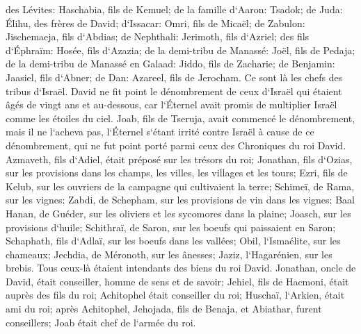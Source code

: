 \verse des Lévites: Haschabia, fils de Kemuel; de la famille d`Aaron: Tsadok; 
\verse de Juda: Élihu, des frères de David; d`Issacar: Omri, fils de Micaël; 
\verse de Zabulon: Jischemaeja, fils d`Abdias; de Nephthali: Jerimoth, fils d`Azriel; 
\verse des fils d`Éphraïm: Hosée, fils d`Azazia; de la demi-tribu de Manassé: Joël, fils de Pedaja; 
\verse de la demi-tribu de Manassé en Galaad: Jiddo, fils de Zacharie; de Benjamin: Jaasiel, fils d`Abner; 
\verse de Dan: Azareel, fils de Jerocham. Ce sont là les chefs des tribus d`Israël. 
\verse David ne fit point le dénombrement de ceux d`Israël qui étaient âgés de vingt ans et au-dessous, car l`Éternel avait promis de multiplier Israël comme les étoiles du ciel. 
\verse Joab, fils de Tseruja, avait commencé le dénombrement, mais il ne l`acheva pas, l`Éternel s`étant irrité contre Israël à cause de ce dénombrement, qui ne fut point porté parmi ceux des Chroniques du roi David. 
\verse Azmaveth, fils d`Adiel, était préposé sur les trésors du roi; Jonathan, fils d`Ozias, sur les provisions dans les champs, les villes, les villages et les tours; 
\verse Ezri, fils de Kelub, sur les ouvriers de la campagne qui cultivaient la terre; 
\verse Schimeï, de Rama, sur les vignes; Zabdi, de Schepham, sur les provisions de vin dans les vignes; 
\verse Baal Hanan, de Guéder, sur les oliviers et les sycomores dans la plaine; Joasch, sur les provisions d`huile; 
\verse Schithraï, de Saron, sur les boeufs qui paissaient en Saron; Schaphath, fils d`Adlaï, sur les boeufs dans les vallées; 
\verse Obil, l`Ismaélite, sur les chameaux; Jechdia, de Méronoth, sur les ânesses; 
\verse Jaziz, l`Hagarénien, sur les brebis. Tous ceux-là étaient intendants des biens du roi David. 
\verse Jonathan, oncle de David, était conseiller, homme de sens et de savoir; Jehiel, fils de Hacmoni, était auprès des fils du roi; 
\verse Achitophel était conseiller du roi; Huschaï, l`Arkien, était ami du roi; 
\verse après Achitophel, Jehojada, fils de Benaja, et Abiathar, furent conseillers; Joab était chef de l`armée du roi. 


